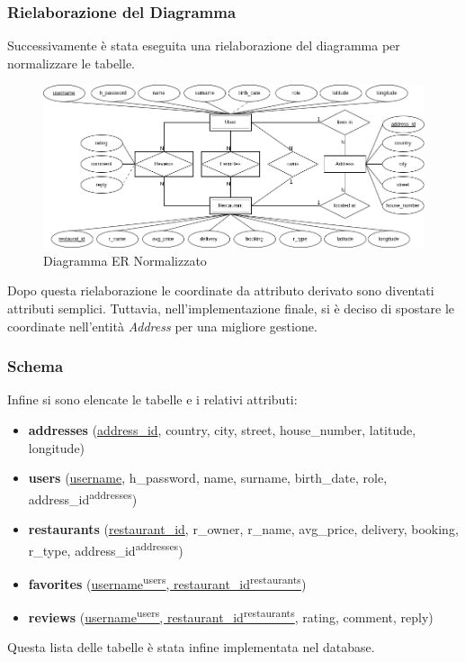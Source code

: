 \subsubsection{Rielaborazione del Diagramma}
Successivamente è stata eseguita una rielaborazione del diagramma
per normalizzare le tabelle.
\begin{figure}[H]
  \centering
  \includegraphics[width=\textwidth]{images/ER-refactored.png}
  \caption{Diagramma ER Normalizzato}
  \label{fig:er-diagram2}
\end{figure}
Dopo questa rielaborazione le coordinate da attributo derivato 
sono diventati attributi semplici.
Tuttavia, nell'implementazione finale, si è deciso di spostare le 
coordinate nell'entità \textit{Address} per una migliore gestione.
\subsubsection{Schema}
Infine si sono elencate le tabelle e i relativi attributi:
\begin{itemize}
    \item \textbf{addresses} (\underline{address\_id}, country, city, street, house\_number, latitude, longitude)
    \item \textbf{users} (\underline{username}, h\_password, name, surname, birth\_date, role, address\_id\textsuperscript{addresses})
    \item \textbf{restaurants} (\underline{restaurant\_id}, r\_owner, r\_name, avg\_price, delivery, booking, r\_type, address\_id\textsuperscript{addresses})
    \item \textbf{favorites} (\underline{username\textsuperscript{users}, restaurant\_id\textsuperscript{restaurants}})
    \item \textbf{reviews} (\underline{username\textsuperscript{users}, restaurant\_id\textsuperscript{restaurants}}, rating, comment, reply)
\end{itemize}
Questa lista delle tabelle è stata infine implementata nel database.

